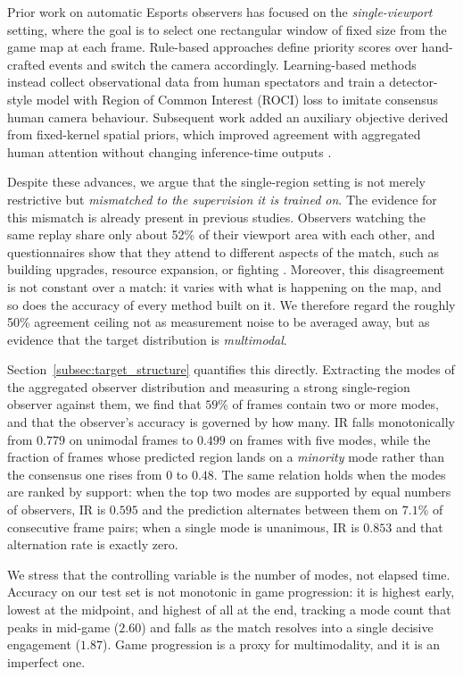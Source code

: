 \documentclass[preprint,12pt]{elsarticle}
\begin{document}
Prior work on automatic Esports observers has focused on the 
\emph{single-viewport} setting, where the goal is to select one rectangular 
window of fixed size from the game map at each frame. Rule-based approaches 
\cite{mattsson2015automatic} define priority scores over hand-crafted events 
and switch the camera accordingly. Learning-based methods 
\cite{joo2023learning} instead collect observational data from human
spectators and train a detector-style model with Region of Common Interest
(ROCI) loss to imitate consensus human camera behaviour. Subsequent work added
an auxiliary objective derived from fixed-kernel spatial priors, which improved
agreement with aggregated human attention without changing inference-time
outputs \cite{anonymous2025kbrs}.

Despite these advances, we argue that the single-region setting is not merely
restrictive but \emph{mismatched to the supervision it is trained on}. The
evidence for this mismatch is already present in previous studies. Observers
watching the same replay share only about 52\% of their viewport area with each
other, and questionnaires show that they attend to different aspects of the
match, such as building upgrades, resource expansion, or fighting
\cite{joo2023learning}. Moreover, this disagreement is not constant over a
match: it varies with what is happening on the map, and so does the accuracy of
every method built on it. We therefore regard the roughly 50\% agreement
ceiling not as measurement noise to be averaged away, but as evidence that the
target distribution is \emph{multimodal}.

Section~\ref{subsec:target_structure} quantifies this directly. Extracting the
modes of the aggregated observer distribution and measuring a strong
single-region observer against them, we find that $59\%$ of frames contain two
or more modes, and that the observer's accuracy is governed by how many. IR
falls monotonically from $0.779$ on unimodal frames to $0.499$ on frames with
five modes, while the fraction of frames whose predicted region lands on a
\emph{minority} mode rather than the consensus one rises from $0$ to $0.48$.
The same relation holds when the modes are ranked by support: when the top two
modes are supported by equal numbers of observers, IR is $0.595$ and the
prediction alternates between them on $7.1\%$ of consecutive frame pairs; when
a single mode is unanimous, IR is $0.853$ and that alternation rate is exactly
zero.

We stress that the controlling variable is the number of modes, not elapsed
time. Accuracy on our test set is not monotonic in game progression: it is
highest early, lowest at the midpoint, and highest of all at the end, tracking
a mode count that peaks in mid-game ($2.60$) and falls as the match resolves
into a single decisive engagement ($1.87$). Game progression is a proxy for
multimodality, and it is an imperfect one.
\end{document}
